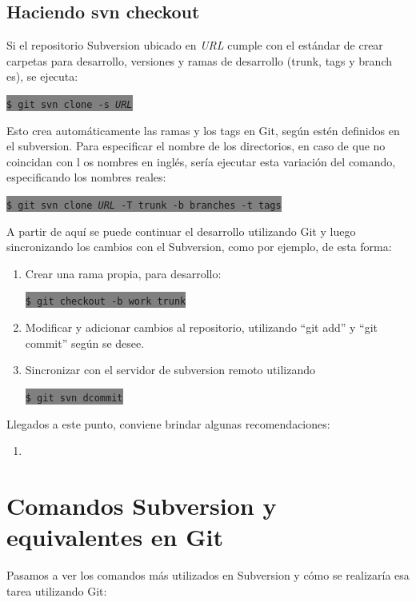 \documentclass[12pt, spanish, oneside, onecolumn, a4paper]{report}
\newcommand{\shellcmd}[1]{ %

  \colorbox{Gray}{
    \indent\indent\texttt{\footnotesize\$ #1}
  }

}
\begin{document}
\subsection{Haciendo svn checkout} 
\label{sec:svncheckout} Si el repositorio Subversion ubicado en 
\emph{URL} cumple con el estándar de crear carpetas para desarrollo, versiones y ramas de desarrollo (trunk, tags y branch es), se ejecuta:
\shellcmd{git svn clone -s 
  \emph{URL}} Esto crea automáticamente las ramas y los tags en Git, según estén definidos en el subversion. Para especificar el nombre de los directorios, en caso de que no coincidan con l os nombres en inglés, sería ejecutar esta variación del comando, especificando los nombres reales: 
\shellcmd{git svn clone 
  \emph{URL} -T trunk -b branches -t tags} A partir de aquí se puede continuar el desarrollo utilizando Git y luego sincronizando los cambios con el Subversion, como por ejemplo, de esta forma: 
\begin{enumerate} 
\item Crear una rama propia, para desarrollo: 
  \shellcmd{git checkout -b work trunk} 
\item Modificar y adicionar cambios al repositorio, utilizando ``git add'' y ``git commit'' según se desee. 
\item Sincronizar con el servidor de subversion remoto utilizando 
  \shellcmd{git svn dcommit} 
\end{enumerate} Llegados a este punto, conviene brindar algunas recomendaciones: 
\begin{enumerate} 
\item 
\end{enumerate} 
\section{Comandos Subversion y equivalentes en Git} 
\label{sec:git2svn} Pasamos a ver los comandos más utilizados en Subversion y cómo se realizaría esa tarea utilizando Git:
\end{document}
